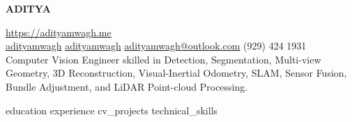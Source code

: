 \documentclass[a4paper, 10pt]{article}
\begin{document}
\begin{center}
	\vspace*{-10pt}
	\begin{center}
		\uppercase{\Huge \bfseries Aditya }
	\end{center}
	\vspace{4pt}
	\href{https://adityamwagh.me}{https://adityamwagh.me} \\

	\vspace{4pt}
	\faLinkedin\space{} \href{https://linkedin.com/in/adityamwagh}{adityamwagh} \space{}
	\faGithub{} \space{} \href{https://github.com/adityamwagh}{adityamwagh} \space{}
	\faAt{} \space{} \href{mailto:adityamwagh@outlook.com}{adityamwagh@outlook.com} \space{}
	\faPhone{} \space{} (929) 424 1931 \\

	\vspace{8pt}
\small{Computer Vision Engineer skilled in Detection, Segmentation, Multi-view Geometry, 3D Reconstruction, Visual-Inertial Odometry, SLAM, Sensor Fusion, Bundle Adjustment, and LiDAR Point-cloud Processing.}
\end{center}

\justifying{}
{education}
{experience}
{cv_projects}
{technical_skills}

\end{document}
